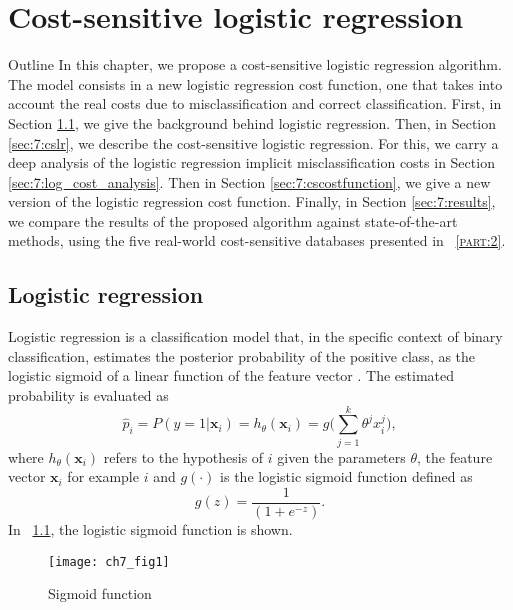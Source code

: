 \chapter{Cost-sensitive logistic regression}\label{ch:7}

\begin{remark}{Outline}
In this chapter, we propose a cost-sensitive logistic regression algorithm. The model consists in 
a new logistic regression cost function, one that takes into account the real costs due to 
misclassification and correct classification. First, in Section \ref{sec:7:logistic}, we give the 
background behind logistic regression. Then, in Section \ref{sec:7:cslr}, we describe the 
cost-sensitive logistic regression. For this, we carry a deep analysis of the 
logistic regression implicit misclassification costs in Section \ref{sec:7:log_cost_analysis}. Then 
in Section \ref{sec:7:cscostfunction}, we give a new version of the logistic regression cost 
function. Finally, in Section \ref{sec:7:results}, we compare the results of the proposed 
algorithm against state-of-the-art methods, using the five real-world cost-sensitive databases 
presented in \partname{~\textsc{\ref{part:2}}}.
\end{remark}


\section{Logistic regression}
\label{sec:7:logistic}

Logistic regression is a classification model that, in the specific context of binary 
classification, estimates the posterior probability of the positive class, as the logistic sigmoid 
of a linear function of the feature vector \citep{Bishop2006}. The estimated probability  is 
evaluated as 
\begin{equation}
  \hat p_i = P(y=1 \vert \mathbf{x}_i) = h_{\theta}(\mathbf{x}_i) = 
  g\bigg(\sum_{j=1}^{k}{\theta^jx_i^j}\bigg),
\end{equation}
where $h_\theta(\mathbf{x}_i)$ refers to the hypothesis of $i$ given the parameters $\theta$, the 
feature vector $\mathbf{x}_i$ for example $i$ and  $g(\cdot)$ is the logistic sigmoid function 
defined as
\begin{equation}
  g(z)=\frac{1}{(1+e^{-z})} .
\end{equation}
In \figurename{~\ref{fig:ch7:1}}, the logistic sigmoid function is shown.
\begin{figure}[htbp]
  \centering
  \texttt{[image: ch7\_fig1]}
  \caption{Sigmoid function}
  \label{fig:ch7:1}
\end{figure}

